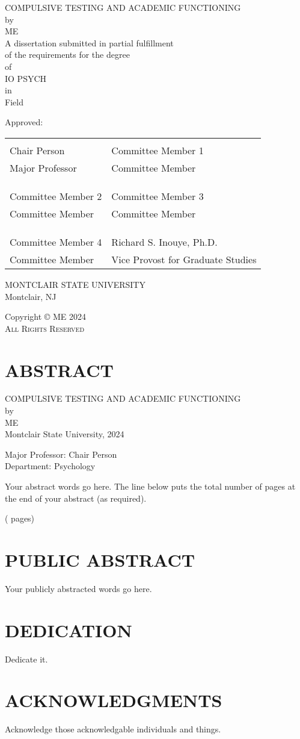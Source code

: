 \documentclass{DissertateUSU}
\renewcommand{\maketitle}{
	\thispagestyle{empty}
	\vspace*{\fill}
	\begin{center}
	\doublespaced
	\MakeUppercase{COMPULSIVE TESTING AND ACADEMIC FUNCTIONING}\\
	by\\
	ME \\
	\singlespaced
	A dissertation submitted in partial fulfillment\\
	of the requirements for the degree \\
	\doublespaced
	of\\
	\MakeUppercase{IO Psych} \\
	in\\
	\singlespaced
  Field \\
	\end{center}

	\vspace{20pt}
	\noindent Approved: \\
	\vspace{30pt}
	\noindent
	\begin{tabular}{ll}
    \makebox[2.75in]{\hrulefill} & \makebox[2.75in]{\hrulefill}\\
    Chair Person                      & Committee Member 1 \\
    Major Professor              & Committee Member \\
    & \\
    & \\
    \makebox[2.75in]{\hrulefill} & \makebox[2.75in]{\hrulefill}\\
    Committee Member 2                 & Committee Member 3 \\
    Committee Member             & Committee Member \\
    & \\
    & \\
    \makebox[2.75in]{\hrulefill} & \makebox[2.75in]{\hrulefill}\\
    Committee Member 4                 & Richard S. Inouye, Ph.D. \\
    Committee Member             & Vice Provost for Graduate Studies \\

    \end{tabular}

  \vspace{20pt}
    \begin{center}
	  \singlespacing
      \MakeUppercase{Montclair State University}\\
	    Montclair, NJ\\
	    \doublespacing
	    2024
	  \end{center}
	\vspace*{\fill}
	\clearpage
}
\newcommand{\abstracttitle}{

  \doublespacing
  \begin{center}
  COMPULSIVE TESTING AND ACADEMIC FUNCTIONING \\
  \vspace{12pt}
  by \\
  \vspace{12pt}
  ME \\
  Montclair State University, 2024
  \end{center}

  \vspace{12pt}

  \singlespacing
  \noindent Major Professor: Chair Person \\
  \noindent Department: Psychology

  \vspace{12pt}
}
\newcommand{\copyrightpage}{
	\vspace*{\fill}
  \begin{center}
	\doublespacing
	Copyright \hspace{3pt}
	  \scshape \small \copyright  \hspace{3pt}
	  ME \hspace{3pt} 2024 \\
	All Rights Reserved
  \end{center}
	\vspace*{\fill}
}
\begin{document}
\maketitle

\pagestyle{empty}
\copyrightpage

\newpage

\pagestyle{plain} \fancyhead[R]{\thepage} \fancyfoot[C]{}

\chapter*{ABSTRACT}

\abstracttitle
\doublespacing

Your abstract words go here. The line below puts the total number of
pages at the end of your abstract (as required).

\begin{flushright}(\pageref{LastPage} pages)\end{flushright}

\newpage
\fancyhead[R]{\thepage}
\fancyfoot[C]{}
\chapter*{PUBLIC ABSTRACT}
\doublespacing

Your publicly abstracted words go here.

\newpage
\fancyhead[R]{\thepage}
\fancyfoot[C]{}
\chapter*{DEDICATION}

Dedicate it.

\newpage
\fancyhead[R]{\thepage}
\fancyfoot[C]{}
\chapter*{ACKNOWLEDGMENTS}

Acknowledge those acknowledgable individuals and things.

\newpage
\fancyhead[R]{\thepage}
\fancyfoot[C]{}
\tableofcontents

\newpage
\fancyhead[R]{\thepage}
\fancyfoot[C]{}
\listoftables
\end{document}
